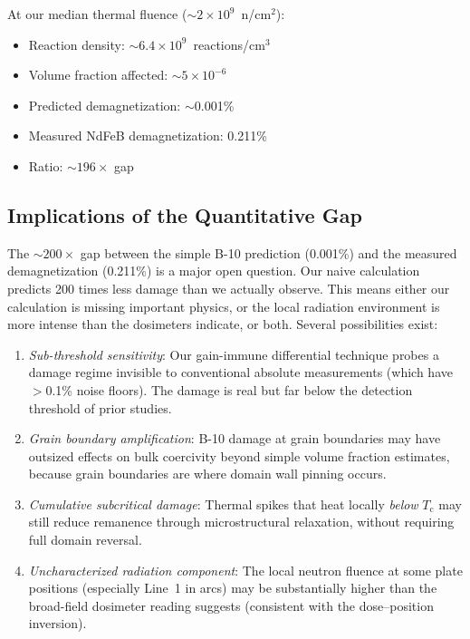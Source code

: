 \documentclass[11pt,letterpaper]{article}
\newcommand{\Tc}{T_\mathrm{c}}
\begin{document}
At our median thermal fluence ($\sim$$2 \times 10^9$~n/cm$^2$):
\begin{itemize}
    \item Reaction density: $\sim$$6.4 \times 10^9$~reactions/cm$^3$
    \item Volume fraction affected: $\sim$$5 \times 10^{-6}$
    \item Predicted demagnetization: $\sim$0.001\%
    \item Measured NdFeB demagnetization: 0.211\%
    \item Ratio: $\sim$$196\times$ gap
\end{itemize}

\subsection{Implications of the Quantitative Gap}

The $\sim$$200\times$ gap between the simple B-10 prediction (0.001\%) and the
measured demagnetization (0.211\%) is a major open question. Our naive
calculation predicts 200 times less damage than we actually observe. This means
either our calculation is missing important physics, or the local radiation
environment is more intense than the dosimeters indicate, or both. Several
possibilities exist:

\begin{enumerate}
    \item \emph{Sub-threshold sensitivity}: Our gain-immune differential
    technique probes a damage regime invisible to conventional absolute
    measurements (which have $>$0.1\% noise floors). The damage is real but far
    below the detection threshold of prior studies.

    \item \emph{Grain boundary amplification}: B-10 damage at grain
    boundaries may have outsized effects on bulk coercivity beyond simple
    volume fraction estimates, because grain boundaries are where domain wall
    pinning occurs.

    \item \emph{Cumulative subcritical damage}: Thermal spikes that heat
    locally \emph{below} $\Tc$ may still reduce remanence through
    microstructural relaxation, without requiring full domain reversal.

    \item \emph{Uncharacterized radiation component}: The local neutron
    fluence at some plate positions (especially Line~1 in arcs) may be
    substantially higher than the broad-field dosimeter reading suggests
    (consistent with the dose--position inversion).
\end{enumerate}
\end{document}
